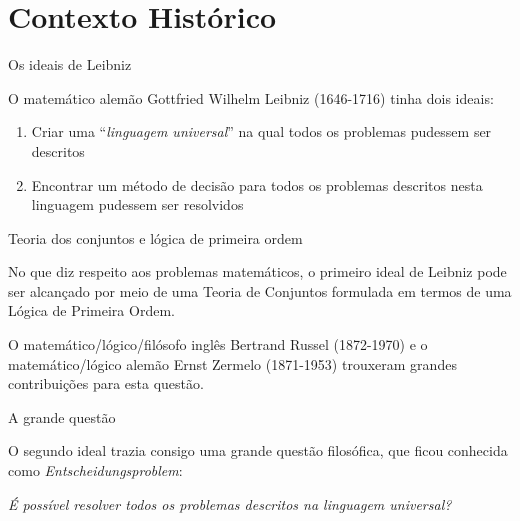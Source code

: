 \section{Contexto Histórico}

\begin{frame}[fragile]{Os ideais de Leibniz}

    O matemático alemão Gottfried Wilhelm Leibniz (1646-1716) tinha dois ideais:

    \vspace{0.2in}

    \begin{enumerate}
        \item Criar uma ``\textit{linguagem universal}'' na qual todos os problemas pudessem
            ser descritos
        \item Encontrar um método de decisão para todos os problemas descritos nesta linguagem
            pudessem ser resolvidos
    \end{enumerate}

\end{frame}

\begin{frame}[fragile]{Teoria dos conjuntos e lógica de primeira ordem}

    No que diz respeito aos problemas matemáticos, o primeiro ideal de Leibniz pode ser alcançado       por meio de uma Teoria de Conjuntos formulada em termos de uma Lógica de Primeira Ordem. 

    \vspace{0.2in}

    O matemático/lógico/filósofo inglês Bertrand Russel (1872-1970) e o matemático/lógico alemão
    Ernst Zermelo (1871-1953) trouxeram grandes contribuições para esta questão.

\end{frame}

\begin{frame}[fragile]{A grande questão}

    O segundo ideal trazia consigo uma grande questão filosófica, que ficou conhecida como
    \textit{Entscheidungsproblem}:

    \vspace{0.2in}
    \begin{center}
        {\it \Large É possível resolver todos os problemas descritos na linguagem universal?}
    \end{center}

\end{frame}

